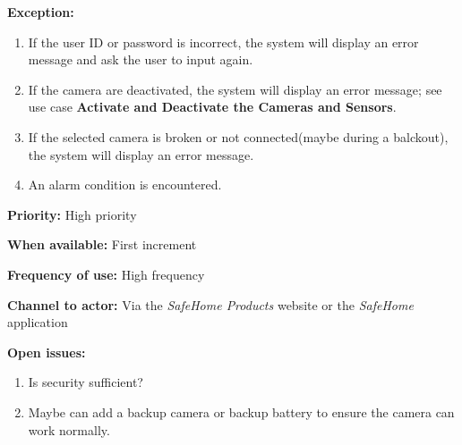 \documentclass[twoside,11pt]{article}
\begin{document}
\begin{center}
{{\begin{multicols}{2}
                \textbf{Exception:}

                \begin{enumerate}
                    \item If the user ID or password is incorrect, the system will display an error message and ask the user to input again.
                    \item If the camera are deactivated, the system will display an error message; see use case \textbf{Activate and Deactivate the Cameras and Sensors}.
                    \item If the selected camera is broken or not connected(maybe during a balckout), the system will display an error message.
                    \item An alarm condition is encountered.
                \end{enumerate}

                \textbf{Priority:} High priority

                \textbf{When available:} First increment

                \textbf{Frequency of use:} High frequency

                \textbf{Channel to actor:} Via the \emph{SafeHome Products} website or the \emph{SafeHome} application

                \textbf{Open issues:}

                \begin{enumerate}
                    \item Is security sufficient?
                    \item Maybe can add a backup camera or backup battery to ensure the camera can work normally.
                \end{enumerate}

            \end{multicols}}}
\end{center}
\newpage
\end{document}
